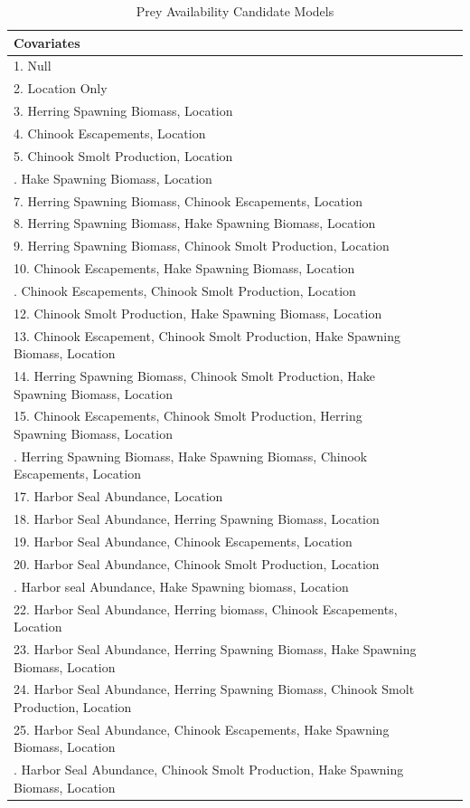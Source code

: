 \documentclass [11pt, proquest] {uwthesis}[2015/03/03]
\begin{document}
\begingroup\fontsize{8}{10}\selectfont
\begin{longtable}[t]{l>{}p{7em}>{}p{7em}>{}p{7em}}
\caption{\label{tab:prmod}Prey Availability Candidate Models}\\
\toprule
Covariates\\
\midrule
1. Null\\
2. Location Only\\
3. Herring Spawning Biomass, Location\\
4. Chinook Escapements, Location\\
5. Chinook Smolt Production, Location\\
\addlinespace
6. Hake Spawning Biomass, Location\\
7. Herring Spawning Biomass, Chinook Escapements, Location\\
8. Herring Spawning Biomass, Hake Spawning Biomass, Location\\
9. Herring Spawning Biomass, Chinook Smolt Production, Location\\
10. Chinook Escapements, Hake Spawning Biomass, Location\\
\addlinespace
11. Chinook Escapements, Chinook Smolt Production, Location\\
12. Chinook Smolt Production, Hake Spawning Biomass, Location\\
13. Chinook Escapement, Chinook Smolt Production, Hake Spawning Biomass, Location\\
14. Herring Spawning Biomass, Chinook Smolt Production, Hake Spawning Biomass, Location\\
15. Chinook Escapements, Chinook Smolt Production, Herring Spawning Biomass, Location\\
\addlinespace
16. Herring Spawning Biomass, Hake Spawning Biomass, Chinook Escapements, Location\\
17. Harbor Seal Abundance, Location\\
18. Harbor Seal Abundance, Herring Spawning Biomass, Location\\
19. Harbor Seal Abundance, Chinook Escapements, Location\\
20. Harbor Seal Abundance, Chinook Smolt Production, Location\\
\addlinespace
21. Harbor seal Abundance, Hake Spawning biomass, Location\\
22. Harbor Seal Abundance, Herring biomass, Chinook Escapements, Location\\
23. Harbor Seal Abundance, Herring Spawning Biomass, Hake Spawning Biomass, Location\\
24. Harbor Seal Abundance, Herring Spawning Biomass, Chinook Smolt Production, Location\\
25. Harbor Seal Abundance, Chinook Escapements, Hake Spawning Biomass, Location\\
\addlinespace
26. Harbor Seal Abundance, Chinook Smolt Production, Hake Spawning Biomass, Location\\
\bottomrule
\end{longtable}
\endgroup{} \clearpage
\end{document}
